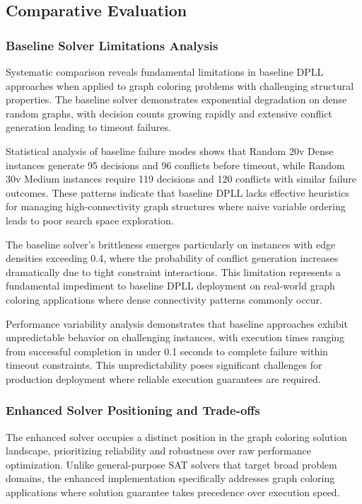 \subsection{Comparative Evaluation}

\subsubsection{Baseline Solver Limitations Analysis}

Systematic comparison reveals fundamental limitations in baseline DPLL approaches when applied to graph coloring problems with challenging structural properties. The baseline solver demonstrates exponential degradation on dense random graphs, with decision counts growing rapidly and extensive conflict generation leading to timeout failures.

Statistical analysis of baseline failure modes shows that Random 20v Dense instances generate 95 decisions and 96 conflicts before timeout, while Random 30v Medium instances require 119 decisions and 120 conflicts with similar failure outcomes. These patterns indicate that baseline DPLL lacks effective heuristics for managing high-connectivity graph structures where naive variable ordering leads to poor search space exploration.

The baseline solver's brittleness emerges particularly on instances with edge densities exceeding 0.4, where the probability of conflict generation increases dramatically due to tight constraint interactions. This limitation represents a fundamental impediment to baseline DPLL deployment on real-world graph coloring applications where dense connectivity patterns commonly occur.

Performance variability analysis demonstrates that baseline approaches exhibit unpredictable behavior on challenging instances, with execution times ranging from successful completion in under 0.1 seconds to complete failure within timeout constraints. This unpredictability poses significant challenges for production deployment where reliable execution guarantees are required.

\subsubsection{Enhanced Solver Positioning and Trade-offs}

The enhanced solver occupies a distinct position in the graph coloring solution landscape, prioritizing reliability and robustness over raw performance optimization. Unlike general-purpose SAT solvers that target broad problem domains, the enhanced implementation specifically addresses graph coloring applications where solution guarantee takes precedence over execution speed.


